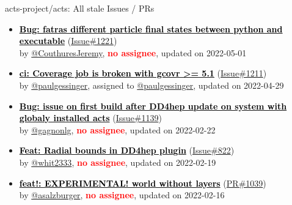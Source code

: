 \begin{frame}[allowframebreaks]{ acts-project/acts: All stale Issues / PRs}
\begin{itemize}
    \item\iss\prstale
    \hspace*{0.1em}
    \textbf{\href{https://github.com/acts-project/acts/issues/1221}{\textcolor{black}{Bug: fatras different particle final states between python and executable}}}
    (\href{https://github.com/acts-project/acts/issues/1221}{Issue\#1221}) \\
    by \href{https://github.com/CouthuresJeremy}{@CouthuresJeremy}, {}\textbf{\textcolor{Red}{no assignee}}, updated on 2022-05-01

    \item\iss\prstale
    \hspace*{0.1em}
    \textbf{\href{https://github.com/acts-project/acts/issues/1211}{\textcolor{black}{ci: Coverage job is broken with gcovr >= 5.1}}}
    (\href{https://github.com/acts-project/acts/issues/1211}{Issue\#1211}) \\
    by \href{https://github.com/paulgessinger}{@paulgessinger}, {}assigned to \href{https://github.com/paulgessinger}{@paulgessinger}, updated on 2022-04-29

    \item\iss\prstale
    \hspace*{0.1em}
    \textbf{\href{https://github.com/acts-project/acts/issues/1139}{\textcolor{black}{Bug: issue on first build after DD4hep update on system with globaly installed acts}}}
    (\href{https://github.com/acts-project/acts/issues/1139}{Issue\#1139}) \\
    by \href{https://github.com/gagnonlg}{@gagnonlg}, {}\textbf{\textcolor{Red}{no assignee}}, updated on 2022-02-22

    \item\iss\prstale
    \hspace*{0.1em}
    \textbf{\href{https://github.com/acts-project/acts/issues/822}{\textcolor{black}{Feat: Radial bounds in DD4hep plugin}}}
    (\href{https://github.com/acts-project/acts/issues/822}{Issue\#822}) \\
    by \href{https://github.com/whit2333}{@whit2333}, {}\textbf{\textcolor{Red}{no assignee}}, updated on 2022-02-19

    \item\propen\prwip\prstale
    \hspace*{0.1em}
    \textbf{\href{https://github.com/acts-project/acts/pull/1039}{\textcolor{black}{feat!: EXPERIMENTAL! world without layers}}}
    (\href{https://github.com/acts-project/acts/pull/1039}{PR\#1039}) \\
    by \href{https://github.com/asalzburger}{@asalzburger}, {}\textbf{\textcolor{Red}{no assignee}}, updated on 2022-02-16


\end{itemize}
\end{frame}
